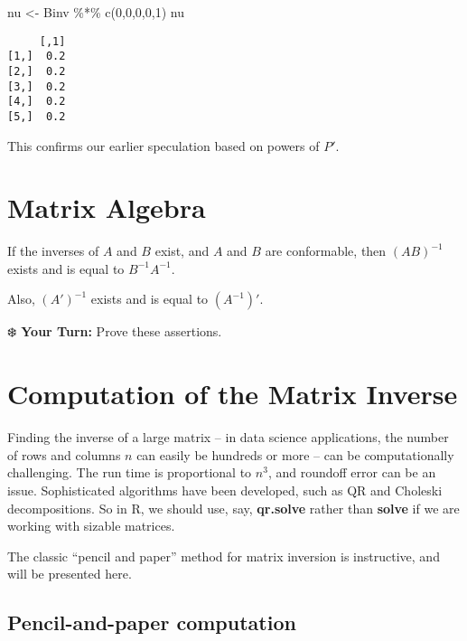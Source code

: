\documentclass[
  letterpaper,
  DIV=11,
  numbers=noendperiod,
  oneside]{scrreprt}
\newenvironment{Shaded}{\begin{snugshade}}{\end{snugshade}}
\newcommand{\DecValTok}[1]{\textcolor[rgb]{0.68,0.00,0.00}{#1}}
\newcommand{\FunctionTok}[1]{\textcolor[rgb]{0.28,0.35,0.67}{#1}}
\newcommand{\NormalTok}[1]{\textcolor[rgb]{0.00,0.23,0.31}{#1}}
\newcommand{\OtherTok}[1]{\textcolor[rgb]{0.00,0.23,0.31}{#1}}
\newcommand{\SpecialCharTok}[1]{\textcolor[rgb]{0.37,0.37,0.37}{#1}}
\begin{document}
\begin{Shaded}
\begin{Highlighting}[]
\NormalTok{nu }\OtherTok{\textless{}{-}}\NormalTok{ Binv }\SpecialCharTok{\%*\%} \FunctionTok{c}\NormalTok{(}\DecValTok{0}\NormalTok{,}\DecValTok{0}\NormalTok{,}\DecValTok{0}\NormalTok{,}\DecValTok{0}\NormalTok{,}\DecValTok{1}\NormalTok{)}
\NormalTok{nu}
\end{Highlighting}
\end{Shaded}

\begin{verbatim}
     [,1]
[1,]  0.2
[2,]  0.2
[3,]  0.2
[4,]  0.2
[5,]  0.2
\end{verbatim}

This confirms our earlier speculation based on powers of \(P'\).

\hypertarget{matrix-algebra-1}{%
\section{Matrix Algebra}\label{matrix-algebra-1}}

If the inverses of \(A\) and \(B\) exist, and \(A\) and \(B\) are
conformable, then \((AB)^{-1}\) exists and is equal to
\(B^{-1} A^{-1}\).

Also, \((A')^{-1}\) exists and is equal to \((A^{-1})'\).

❄️ \textbf{Your Turn:} Prove these assertions.

\hypertarget{computation-of-the-matrix-inverse}{%
\section{Computation of the Matrix
Inverse}\label{computation-of-the-matrix-inverse}}

Finding the inverse of a large matrix -- in data science applications,
the number of rows and columns \(n\) can easily be hundreds or more --
can be computationally challenging. The run time is proportional to
\(n^3\), and roundoff error can be an issue. Sophisticated algorithms
have been developed, such as QR and Choleski decompositions. So in R, we
should use, say, \textbf{qr.solve} rather than \textbf{solve} if we are
working with sizable matrices.

The classic ``pencil and paper'' method for matrix inversion is
instructive, and will be presented here.

\hypertarget{pencil-and-paper-computation}{%
\subsection{Pencil-and-paper
computation}\label{pencil-and-paper-computation}}
\end{document}
